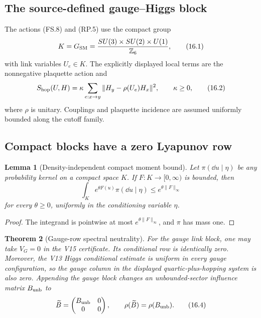 \documentclass[11pt]{article}
\newtheorem{theorem}{Theorem}[section]
\newtheorem{lemma}[theorem]{Lemma}
\theoremstyle{remark}
\begin{document}
\subsection{The source-defined gauge--Higgs block}

The actions \textup{(FS.8)} and \textup{(RP.5)} use the compact
group
\[
 K=G_{\rm SM}
 =\frac{SU(3)\times SU(2)\times U(1)}{\mathbb Z_6},                \tag{16.1}
\]
with link variables \(U_e\in K\).  The explicitly displayed local
terms are the nonnegative plaquette action and
\[
 S_{\rm hop}(U,H)
 =\kappa\sum_{e:x\to y}
 \|H_y-\rho(U_e)H_x\|^2,\qquad\kappa\geq0,          \tag{16.2}
\]
where \(\rho\) is unitary.  Couplings and plaquette incidence are
assumed uniformly bounded along the cutoff family.

\subsection{Compact blocks have a zero Lyapunov row}

\begin{lemma}[Density-independent compact moment bound]
\label{lem:v17v16-compact}
Let \(\pi(\dd u\mid\eta)\) be any probability kernel on a compact
space \(K\).  If \(F:K\to[0,\infty)\) is bounded, then
\[
 \int_K e^{\theta F(u)}\pi(\dd u\mid\eta)
 \leq e^{\theta\|F\|_\infty}                       \tag{16.3}
\]
for every \(\theta\geq0\), uniformly in the conditioning variable
\(\eta\).
\end{lemma}

\begin{proof}
The integrand is pointwise at most
\(e^{\theta\|F\|_\infty}\), and \(\pi\) has mass one.
\end{proof}

\begin{theorem}[Gauge-row spectral neutrality]
\label{thm:v17v16-zero-row}
For the gauge link block, one may take \(V_G=0\) in the V15
certificate.  Its conditional row is identically zero.  Moreover,
the V13 Higgs conditional estimate is uniform in every gauge
configuration, so the gauge column in the displayed
quartic-plus-hopping system is also zero.  Appending the gauge
block changes an unbounded-sector influence matrix \(B_{\rm unb}\)
to
\[
 \widetilde B=
 \begin{pmatrix}
 B_{\rm unb}&0\\
 0&0
 \end{pmatrix},
 \qquad
 \rho(\widetilde B)=\rho(B_{\rm unb}).              \tag{16.4}
\]
\end{theorem}
\end{document}
